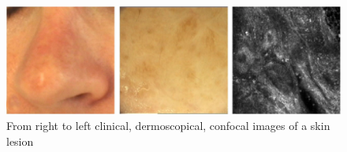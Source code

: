 \begin{figure}
    \centerline{\includegraphics[width=1\columnwidth]{02-related-works/figures/sample-clsm-images.png}}
    \caption{From right to left clinical, dermoscopical, confocal images of a skin lesion \cite{ruini2016invisible}}
    \label{fig:sample-clsm-images}
\end{figure}
